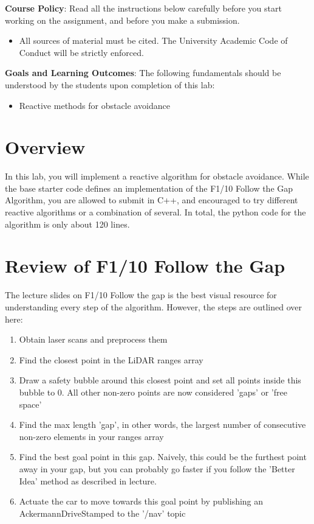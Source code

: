 \documentclass[a4 paper]{article}
\begin{document}
\textbf{Course Policy}: Read all the instructions below carefully before you start working on the assignment, and before you make a submission.
\begin{itemize}
    \item All sources of material must be cited. The University Academic Code of Conduct
will be strictly enforced.
\end{itemize}
\textbf{Goals and Learning Outcomes}: The following fundamentals should be understood by the students upon completion of this lab:
\begin{itemize}
    \item Reactive methods for obstacle avoidance
\end{itemize}
\section{Overview}
In this lab, you will implement a reactive algorithm for obstacle avoidance. While the base starter code defines an implementation of the F1/10 Follow the Gap Algorithm, you are allowed to submit in C++, and encouraged to try different reactive algorithms or a combination of several. In total, the python code for the algorithm is only about 120 lines. 

\section{Review of F1/10 Follow the Gap}
The lecture slides on F1/10 Follow the gap is the best visual resource for understanding every step of the algorithm. However, the steps are outlined over here:
\begin{enumerate}
	\item Obtain laser scans and preprocess them 
	\item Find the closest point in the LiDAR ranges array
	\item Draw a safety bubble around this closest point and set all points inside this bubble to 0. All other non-zero points are now considered 'gaps' or 'free space'
	\item Find the max length 'gap', in other words, the largest number of consecutive non-zero elements in your ranges array
	\item Find the best goal point in this gap. Naively, this could be the furthest point away in your gap, but you can probably go faster if you follow the 'Better Idea' method as described in lecture. 
	\item Actuate the car to move towards this goal point by publishing an AckermannDriveStamped to the '/nav' topic
\end{enumerate}
\end{document}
